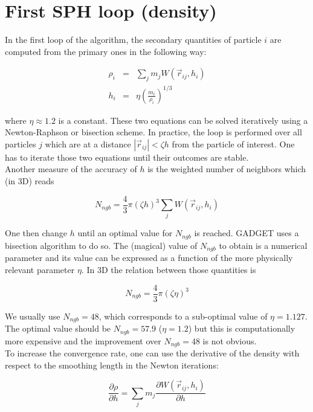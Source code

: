 \documentclass[a4paper,10pt]{article}
\begin{document}
\section{First SPH loop (density)}
\label{sec:density}

In the first loop of the algorithm, the secondary quantities of particle $i$ are computed from the primary ones in the
following way:

\begin{eqnarray}
 \rho_i &=& \sum_j m_j W(\vec{r}_{ij}, h_i)\\
 h_i &=& \eta \left(\frac{m_i}{\rho_i} \right)^{1/3}
\end{eqnarray}

where $\eta \approx 1.2$ is a constant. These two equations can be solved iteratively using a Newton-Raphson or
bisection scheme. In practice, the loop is performed over all particles $j$ which are at a distance
$|\vec{r}_{ij}|<\zeta
h$ from the particle of interest. One has to iterate those two equations until their outcomes are stable.\\
Another measure of the accuracy of $h$ is the weighted number of neighbors which (in 3D) reads

\begin{equation}
 N_{ngb} = \frac{4}{3}\pi \left(\zeta h\right)^3 \sum_j W(\vec{r}_{ij},h_i)
\end{equation}

One then change $h$ until an optimal value for $N_{ngb}$ is reached. GADGET uses a bisection algorithm to do so.
The (magical) value of $N_{ngb}$ to obtain is a numerical parameter and its value can be expressed as a function of the
more physically relevant parameter $\eta$. In 3D the relation between those quantities is

\begin{equation}
 N_{ngb} = \frac{4}{3}\pi\left(\zeta \eta\right)^3
\end{equation}

We usually use $N_{ngb} = 48$, which corresponds to a sub-optimal value of $\eta=1.127$. The optimal value should be
$N_{ngb}=57.9$ ($\eta=1.2$) but this is computationally more expensive and the improvement over $N_{ngb}=48$ is not
obvious.\\ 

To increase the convergence rate, one can use the derivative of the density with respect to the smoothing length in the
Newton iterations:

\begin{equation}
 \frac{\partial \rho}{\partial h} = \sum_j m_j \frac{\partial W(\vec{r}_{ij},h_i)}{\partial h}
\end{equation}
\end{document}
